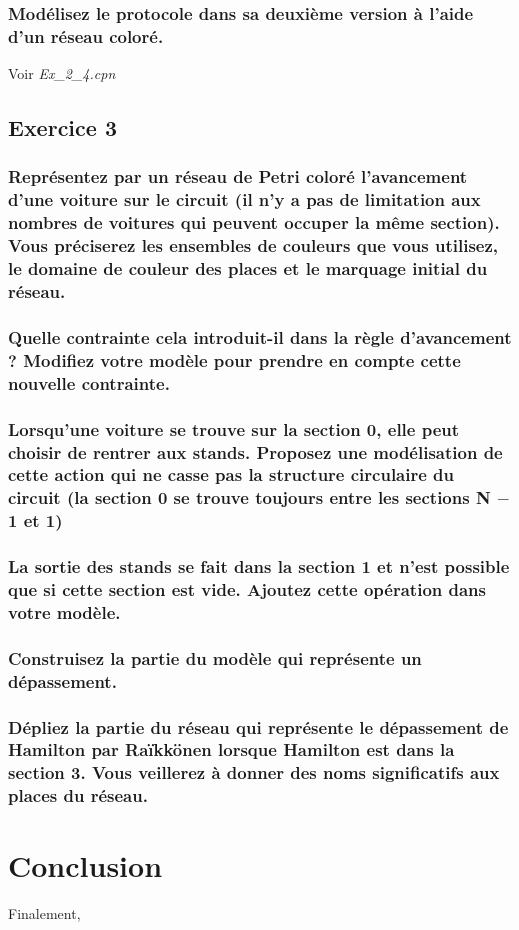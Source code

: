 \documentclass[french]{article}
\begin{document}
\subsubsection{Modélisez le protocole dans sa deuxième version à l’aide d’un réseau coloré.}
Voir \textit{Ex\_2\_4.cpn}
\subsection{Exercice 3}
\subsubsection{Représentez par un réseau de Petri coloré l’avancement d’une voiture sur le circuit (il n’y a pas de 
limitation aux nombres de voitures qui peuvent occuper la même section). Vous préciserez les ensembles de couleurs que vous 
utilisez, le domaine de couleur des places et le marquage initial du réseau.}
\subsubsection{Quelle contrainte cela introduit-il dans la règle d’avancement ? Modifiez votre modèle pour prendre en compte 
cette nouvelle contrainte.}
\subsubsection{Lorsqu’une voiture se trouve sur la section 0, elle peut choisir de rentrer aux stands. Proposez une 
modélisation de cette action qui ne casse pas la structure circulaire du circuit (la section 0 se trouve toujours entre les 
sections N $-$ 1 et 1)}
\subsubsection{La sortie des stands se fait dans la section 1 et n’est possible que si cette section est vide. Ajoutez cette 
opération dans votre modèle.}
\subsubsection{Construisez la partie du modèle qui 
représente un dépassement.}
\subsubsection{Dépliez la partie du réseau qui représente le dépassement de Hamilton par Raïkkönen lorsque Hamilton est dans 
la section 3. Vous veillerez à donner des noms significatifs aux places du réseau.}
\section{Conclusion}
Finalement, 
\end{document}
